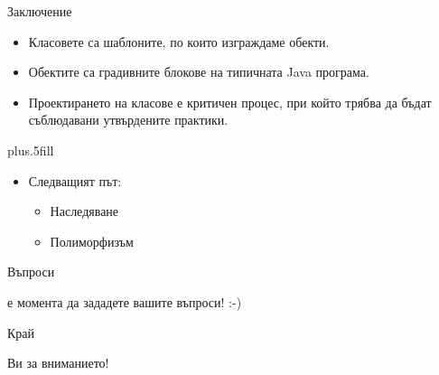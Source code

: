 \documentclass{beamer}
\begin{document}
\begin{frame}{Заключение}
  \transdissolve
  \begin{itemize}
  \item
    Класовете са шаблоните, по които изграждаме обекти.
  \item
    Обектите са градивните блокове на типичната Java програма.
  \item
    Проектирането на класове е критичен процес, при който трябва да
    бъдат съблюдавани утвърдените практики.
  \end{itemize}
  
  \vskip0pt plus.5fill
  \begin{itemize}
  \item
    Следващият път:
    \begin{itemize}
    \item
      Наследяване
    \item
      Полиморфизъм
    \end{itemize}
  \end{itemize}
\end{frame}

\begin{frame}{Въпроси}
  \transdissolve
  \begin{center}
     е момента да зададете вашите въпроси! :-)
  \end{center}
\end{frame}

\begin{frame}{Край}
  \transdissolve
  \begin{center}
     Ви за вниманието!
  \end{center}
\end{frame}
\end{document}
